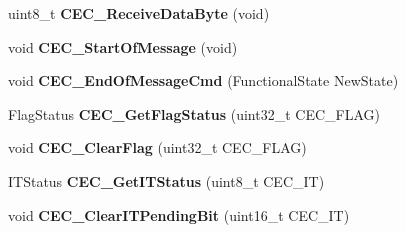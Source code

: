\begin{DoxyCompactItemize}
\item 
\hypertarget{group__CEC__Exported__Functions_ga165837bff6292e7674eff6f8b230da97}{
uint8\_\-t {\bfseries CEC\_\-ReceiveDataByte} (void)}
\label{group__CEC__Exported__Functions_ga165837bff6292e7674eff6f8b230da97}

\item 
\hypertarget{group__CEC__Exported__Functions_ga71e700461ffe7820d9e1c75da65fd0fb}{
void {\bfseries CEC\_\-StartOfMessage} (void)}
\label{group__CEC__Exported__Functions_ga71e700461ffe7820d9e1c75da65fd0fb}

\item 
\hypertarget{group__CEC__Exported__Functions_ga1e2cf6e3a1ac891f2814f9d3f4043574}{
void {\bfseries CEC\_\-EndOfMessageCmd} (FunctionalState NewState)}
\label{group__CEC__Exported__Functions_ga1e2cf6e3a1ac891f2814f9d3f4043574}

\item 
\hypertarget{group__CEC__Exported__Functions_gaf920706cb350182bf0728c66868053ca}{
FlagStatus {\bfseries CEC\_\-GetFlagStatus} (uint32\_\-t CEC\_\-FLAG)}
\label{group__CEC__Exported__Functions_gaf920706cb350182bf0728c66868053ca}

\item 
\hypertarget{group__CEC__Exported__Functions_ga928b373fb5972204c56f9c64113f8c67}{
void {\bfseries CEC\_\-ClearFlag} (uint32\_\-t CEC\_\-FLAG)}
\label{group__CEC__Exported__Functions_ga928b373fb5972204c56f9c64113f8c67}

\item 
\hypertarget{group__CEC__Exported__Functions_gaa1940a388d0bfcefe7483fb74cc2ba1d}{
ITStatus {\bfseries CEC\_\-GetITStatus} (uint8\_\-t CEC\_\-IT)}
\label{group__CEC__Exported__Functions_gaa1940a388d0bfcefe7483fb74cc2ba1d}

\item 
\hypertarget{group__CEC__Exported__Functions_gade646921262a077172c708953822f248}{
void {\bfseries CEC\_\-ClearITPendingBit} (uint16\_\-t CEC\_\-IT)}
\label{group__CEC__Exported__Functions_gade646921262a077172c708953822f248}

\end{DoxyCompactItemize}
